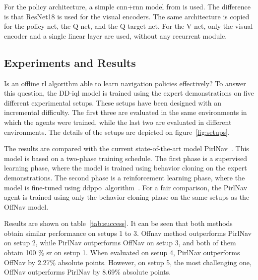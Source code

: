 For the policy architecture, a simple \acrshort{cnn}+\acrshort{rnn} model from\cite{ramrakhya2023} is used.
The difference is that ResNet18 is used for the visual encoders.
The same architecture is copied for the policy net, the Q net, and the Q target net.
For the V net, only the visual encoder and a single linear layer are used, without any recurrent module.

\subsection{Experiments and Results}\label{subsec:experiments_offnav}

Is an offline \acrshort{rl} algorithm able to learn navigation policies effectively?
To answer this question, the DD-\acrshort{iql} model is trained using the expert demonstrations on five different experimental setups.
These setups have been designed with an incremental difficulty.
The first three are evaluated in the same environments in which the agents were trained, while the last two are evaluated in different environments.
The details of the setups are depicted on figure~\ref{fig:setups}.

The results are compared with the current state-of-the-art model PirlNav~\cite{ramrakhya2023}.
This model is based on a two-phase training schedule.
The first phase is a supervised learning phase, where the model is trained using behavior cloning on the expert demonstrations.
The second phase is a reinforcement learning phase, where the model is fine-tuned using \acrshort{ddppo}~algorithm~\cite{wijmans2020}.
For a fair comparison, the PirlNav agent is trained using only the behavior cloning phase on the same setups as the OffNav model.

Results are shown on table~\ref{tab:success}.
It can be seen that both methods obtain similar performance on setups 1 to 3.
Offnav method outperforms PirlNav on setup 2, while PirlNav outperforms OffNav on setup 3, and both of them obtain 100 \% \acrshort{sr} on setup 1.
When evaluated on setup 4, PirlNav outperforms OffNav by 2.27\% absolute points.
However, on setup 5, the most challenging one, OffNav outperforms PirlNav by 8.69\% absolute points.

